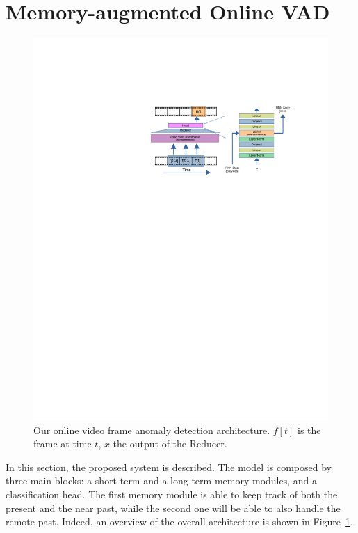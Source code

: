 \section{Memory-augmented Online VAD}
\label{sec:theory}

\fboxsep=1mm%
\fboxrule=1pt%

\begin{figure}[!ht]
	\centering
            \includegraphics[trim=205 500 80 130, clip, width=1.\linewidth]{images/arch.pdf}
        \caption{Our online video frame anomaly detection architecture. $f[t]$ is the frame at time $t$, $x$ the output of the Reducer.}
		\label{fig:arch}
\end{figure}

In this section, the proposed system is described.  
The model is composed by three main blocks: a short-term and a long-term  memory modules, and a classification head. 
The first memory module is able to keep track of both the present and the near past, while the second one will be able to also handle the remote past. Indeed, an overview of the overall architecture is shown in Figure~\ref{fig:arch}.

